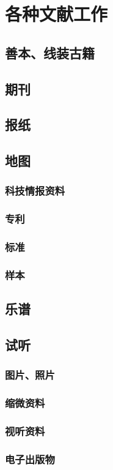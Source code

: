 \documentclass[UTF8]{../../ApplicationUniverse}
\begin{document}
\section{各种文献工作}
\subsection{善本、线装古籍}
\subsection{期刊}
\subsection{报纸}
\subsection{地图}
    \subsubsection{科技情报资料}
    \subsubsection{专利}
    \subsubsection{标准}
    \subsubsection{样本}
\subsection{乐谱}
\subsection{试听}
    \subsubsection{图片、照片}
    \subsubsection{缩微资料}
    \subsubsection{视听资料}
    \subsubsection{电子出版物}
\end{document}
